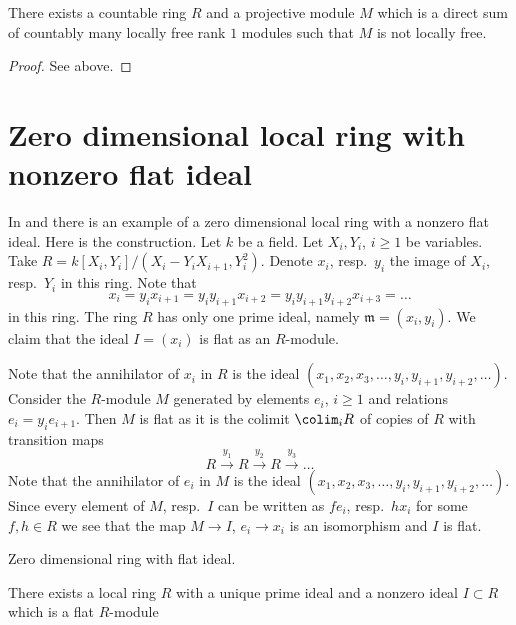 \begin{lemma}
\label{lemma-projective-not-locally-free}
There exists a countable ring $R$ and a projective module $M$
which is a direct sum of countably many locally free rank $1$
modules such that $M$ is not locally free.
\end{lemma}

\begin{proof}
See above.
\end{proof}







\section{Zero dimensional local ring with nonzero flat ideal}
\label{section-zero-dimensional-flat-ideal}

\noindent
In \cite{Lazard} and \cite{Autour}
there is an example of a zero dimensional local ring with a
nonzero flat ideal. Here is the construction. Let $k$ be a field.
Let $X_i, Y_i$, $i \geq 1$ be variables. Take
$R = k[X_i, Y_i]/(X_i - Y_i X_{i + 1}, Y_i^2)$. Denote $x_i$, resp.\ $y_i$
the image of $X_i$, resp.\ $Y_i$ in this ring. Note that
$$
x_i = y_i x_{i + 1} = y_i y_{i +1} x_{i + 2} =
y_i y_{i + 1} y_{i + 2} x_{i + 3} = \ldots
$$
in this ring. The ring $R$ has only
one prime ideal, namely $\mathfrak m = (x_i, y_i)$. We claim that
the ideal $I = (x_i)$ is flat as an $R$-module.

\medskip\noindent
Note that the annihilator of $x_i$ in $R$ is the ideal
$(x_1, x_2, x_3, \ldots, y_i, y_{i + 1}, y_{i + 2}, \ldots)$.
Consider the $R$-module $M$ generated by elements $e_i$, $i \geq 1$ and
relations $e_i = y_i e_{i + 1}$. Then $M$ is flat as it is the
colimit $\colim_i R$ of copies of $R$ with transition maps
$$
R \xrightarrow{y_1} R \xrightarrow{y_2} R \xrightarrow{y_3} \ldots
$$
Note that the annihilator of $e_i$ in $M$ is the ideal
$(x_1, x_2, x_3, \ldots, y_i, y_{i + 1}, y_{i + 2}, \ldots)$.
Since every element of $M$, resp.\ $I$ can be written as
$f e_i$, resp.\ $h x_i$ for some $f, h \in R$ we see that the
map $M \to I$, $e_i \to x_i$ is an isomorphism and $I$ is flat.

\begin{lemma}
\label{lemma-zero-dimensional-flat-ideal}
\begin{slogan}
Zero dimensional ring with flat ideal.
\end{slogan}
There exists a local ring $R$ with a unique prime ideal
and a nonzero ideal $I \subset R$ which is a flat $R$-module
\end{lemma}

